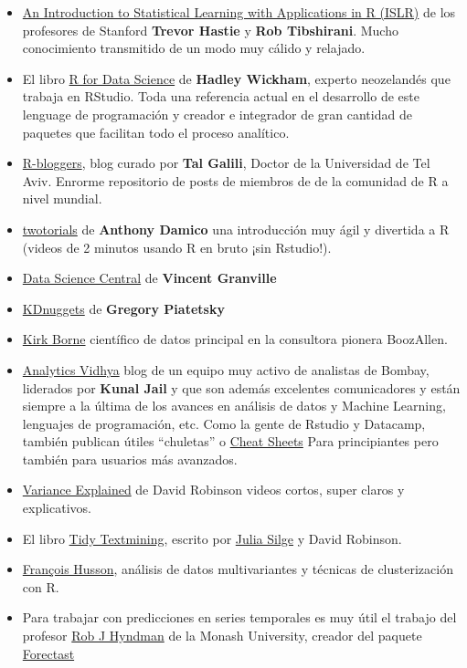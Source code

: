 \documentclass[]{book}
\theoremstyle{definition}
\theoremstyle{definition}
\theoremstyle{remark}
\begin{document}
\begin{itemize}
\item
  \href{http://www-bcf.usc.edu/\%7Egareth/ISL/}{An Introduction to
  Statistical Learning with Applications in R (ISLR)} de los profesores
  de Stanford \textbf{Trevor Hastie} y \textbf{Rob Tibshirani}. Mucho
  conocimiento transmitido de un modo muy cálido y relajado.
\item
  El libro \href{http://r4ds.had.co.nz/}{R for Data Science} de
  \textbf{Hadley Wickham}, experto neozelandés que trabaja en RStudio.
  Toda una referencia actual en el desarrollo de este lenguage de
  programación y creador e integrador de gran cantidad de paquetes que
  facilitan todo el proceso analítico.
\item
  \href{https://www.r-bloggers.com}{R-bloggers}, blog curado por
  \textbf{Tal Galili}, Doctor de la Universidad de Tel Aviv. Enrorme
  repositorio de posts de miembros de de la comunidad de R a nivel
  mundial.
\item
  \href{http://www.twotorials.com/}{twotorials} de \textbf{Anthony
  Damico} una introducción muy ágil y divertida a R (videos de 2 minutos
  usando R en bruto ¡sin Rstudio!).
\item
  \href{http://www.datasciencecentral.com}{Data Science Central} de
  \textbf{Vincent Granville}
\item
  \href{http://www.kdnuggets.com/}{KDnuggets} de \textbf{Gregory
  Piatetsky}
\item
  \href{http://kirkborne.net/}{Kirk Borne} científico de datos principal
  en la consultora pionera BoozAllen.
\item
  \href{https://www.analyticsvidhya.com}{Analytics Vidhya} blog de un
  equipo muy activo de analistas de Bombay, liderados por \textbf{Kunal
  Jail} y que son además excelentes comunicadores y están siempre a la
  última de los avances en análisis de datos y Machine Learning,
  lenguajes de programación, etc. Como la gente de Rstudio y Datacamp,
  también publican útiles ``chuletas'' o
  \href{https://www.analyticsvidhya.com/blog/2017/02/top-28-cheat-sheets-for-machine-learning-data-science-probability-sql-big-data/}{Cheat
  Sheets} Para principiantes pero también para usuarios más avanzados.
\item
  \href{http://varianceexplained.org/RData/}{Variance Explained} de
  David Robinson videos cortos, super claros y explicativos.
\item
  El libro \href{http://tidytextmining.com/intro.html}{Tidy Textmining},
  escrito por \href{https://juliasilge.com/}{Julia Silge} y David
  Robinson.
\item
  \href{http://math.agrocampus-ouest.fr/infoglueDeliverLive/membres/Francois.Husson}{François
  Husson}, análisis de datos multivariantes y técnicas de clusterización
  con R.
\item
  Para trabajar con predicciones en series temporales es muy útil el
  trabajo del profesor \href{https://www.otexts.org/fpp}{Rob J Hyndman}
  de la Monash University, creador del paquete
  \href{http://robjhyndman.com/software/forecast/\%22}{Forectast}
\end{itemize}
\end{document}
